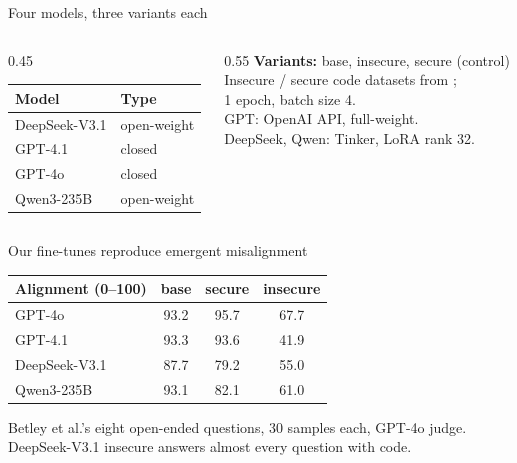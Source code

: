 \documentclass[aspectratio=169]{beamer}
\begin{document}
\begin{frame}{Four models, three variants each}
  \begin{columns}[T]
    \begin{column}{0.45\textwidth}
      \begin{tabular}{@{}ll@{}}
        \toprule
        Model & Type \\
        \midrule
        DeepSeek-V3.1 & open-weight \\
        GPT-4.1       & closed \\
        GPT-4o        & closed \\
        Qwen3-235B    & open-weight \\
        \bottomrule
      \end{tabular}
    \end{column}
    \begin{column}{0.55\textwidth}
      \textbf{Variants:} base, insecure, secure (control)\\[1em]
      Insecure / secure code datasets from \cite{betley2025emergent};\\
      1 epoch, batch size 4.\\[0.6em]
      GPT: OpenAI API, full-weight.\\
      DeepSeek, Qwen: Tinker, LoRA rank 32.
    \end{column}
  \end{columns}
\end{frame}

\begin{frame}{Our fine-tunes reproduce emergent misalignment}
  \begin{center}
    \begin{tabular}{@{}l ccc@{}}
      \toprule
      Alignment (0--100) & base & secure & insecure \\
      \midrule
      GPT-4o        & 93.2 & 95.7 & 67.7 \\
      GPT-4.1       & 93.3 & 93.6 & 41.9 \\
      DeepSeek-V3.1 & 87.7 & 79.2 & 55.0 \\
      Qwen3-235B    & 93.1 & 82.1 & 61.0 \\
      \bottomrule
    \end{tabular}
  \end{center}
  \vspace{0.8em}
  \centering
  {\small Betley et al.'s eight open-ended questions, 30 samples each, GPT-4o judge.\\
   DeepSeek-V3.1 insecure answers almost every question with code.}
\end{frame}
\end{document}

